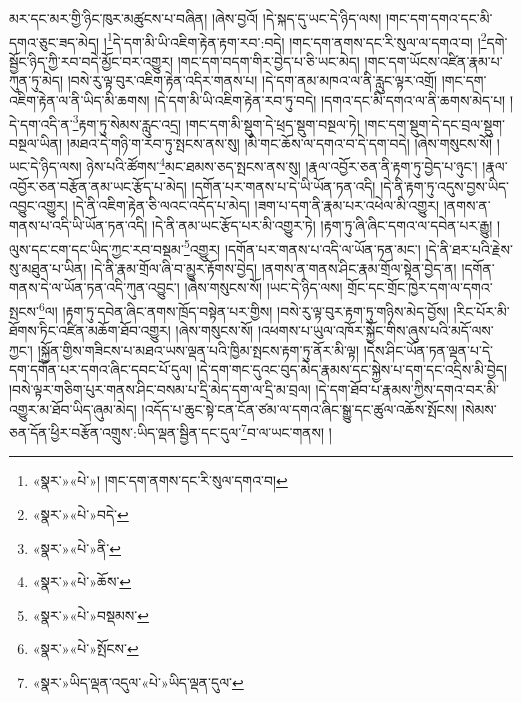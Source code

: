 མར་དང་མར་གྱི་ཉིང་ཁུར་མཚུངས་པ་བཞིན། །ཞེས་བྱའོ། །དེ་སྐད་དུ་ཡང་དེ་ཉིད་ལས། །གང་དག་དགའ་དང་མི་དགའ་ཅུང་ཟད་མེད། །\footnote{«སྣར་»«པེ་»། །གང་དག་ནགས་དང་རི་སུལ་དགའ་བ། }དེ་དག་མི་ཡི་འཇིག་རྟེན་རྟག་རབ་:བདེ། །གང་དག་ནགས་དང་རི་སུལ་ལ་དགའ་བ། །\footnote{«སྣར་»«པེ་»བདེ་}དགེ་སྦྱོང་ཉིད་ཀྱི་རབ་བདེ་མྱོང་བར་འགྱུར། །གང་དག་བདག་གིར་བྱེད་པ་ཅི་ཡང་མེད། །གང་དག་ཡོངས་འཛིན་རྣམ་པ་ཀུན་ཏུ་མེད། །བསེ་རུ་ལྟ་བུར་འཇིག་རྟེན་འདིར་གནས་པ། །དེ་དག་ནམ་མཁའ་ལ་ནི་རླུང་ལྟར་འགྲོ། །གང་དག་འཇིག་རྟེན་ལ་ནི་ཡིད་མི་ཆགས། །དེ་དག་མི་ཡི་འཇིག་རྟེན་རབ་ཏུ་བདེ། །དགའ་དང་མི་དགའ་ལ་ནི་ཆགས་མེད་པ། །དེ་དག་འདི་ན་\footnote{«སྣར་»«པེ་»ནི་}རྟག་ཏུ་སེམས་རླུང་འདྲ། །གང་དག་མི་སྡུག་དེ་ཕྲད་སྡུག་བསྔལ་ཏེ། །གང་དག་སྡུག་དེ་དང་བྲལ་སྡུག་བསྔལ་ཡིན། །མཐའ་དེ་གཉི་ག་རབ་ཏུ་སྤངས་ནས་སུ། །མི་གང་ཆོས་ལ་དགའ་བ་དེ་དག་བདེ། །ཞེས་གསུངས་སོ། །ཡང་དེ་ཉིད་ལས། ཉེས་པའི་ཚོགས་\footnote{«སྣར་»«པེ་»ཆོས་}མང་ཐམས་ཅད་སྤངས་ནས་སུ། །རྣལ་འབྱོར་ཅན་ནི་རྟག་ཏུ་བྱེད་པ་ཉུང་། །རྣལ་འབྱོར་ཅན་བརྩོན་ནམ་ཡང་རྩོད་པ་མེད། །དགོན་པར་གནས་པ་དེ་ཡི་ཡོན་ཏན་འདི། །དེ་ནི་རྟག་ཏུ་འདུས་བྱས་ཡིད་འབྱུང་འགྱུར། །དེ་ནི་འཇིག་རྟེན་ཅི་ལའང་འདོད་པ་མེད། །ཟག་པ་དག་ནི་རྣམ་པར་འཕེལ་མི་འགྱུར། །ནགས་ན་གནས་པ་འདི་ཡི་ཡོན་ཏན་འདི། །དེ་ནི་ནམ་ཡང་རྩོད་པར་མི་འགྱུར་ཏེ། །རྟག་ཏུ་ཞི་ཞིང་དགའ་ལ་དབེན་པར་རྒྱུ། །ལུས་དང་ངག་དང་ཡིད་ཀྱང་རབ་བསྡམ་\footnote{«སྣར་»«པེ་»བསྡམས་}འགྱུར། །དགོན་པར་གནས་པ་འདི་ལ་ཡོན་ཏན་མང་། །དེ་ནི་ཐར་པའི་རྗེས་སུ་མཐུན་པ་ཡིན། །དེ་ནི་རྣམ་གྲོལ་ཞི་བ་མྱུར་རྟོགས་བྱེད། །ནགས་ན་གནས་ཤིང་རྣམ་གྲོལ་སྟེན་བྱེད་ན། །དགོན་གནས་དེ་ལ་ཡོན་ཏན་འདི་ཀུན་འབྱུང་། །ཞེས་གསུངས་སོ། །ཡང་དེ་ཉིད་ལས། གྲོང་དང་གྲོང་ཁྱེར་དག་ལ་དགའ་སྤངས་\footnote{«སྣར་»«པེ་»སྤོངས་}ལ། །རྟག་ཏུ་དབེན་ཞིང་ནགས་ཁྲོད་བསྟེན་པར་གྱིས། །བསེ་རུ་ལྟ་བུར་རྟག་ཏུ་གཉིས་མེད་བྱོས། །རིང་པོར་མི་ཐོགས་ཏིང་འཛིན་མཆོག་ཐོབ་འགྱུར། །ཞེས་གསུངས་སོ། །འཕགས་པ་ཡུལ་འཁོར་སྐྱོང་གིས་ཞུས་པའི་མདོ་ལས་ཀྱང་། །སྐྱོན་གྱིས་གཟིངས་པ་མཐའ་ཡས་ལྡན་པའི་ཁྱིམ་སྤངས་རྟག་ཏུ་ནོར་མི་ལྟ། །དེས་ཤིང་ཡོན་ཏན་ལྡན་པ་དེ་དག་དགོན་པར་དགའ་ཞིང་དབང་པོ་དུལ། །དེ་དག་གང་དུའང་བུད་མེད་རྣམས་དང་སྐྱེས་པ་དག་དང་འདྲིས་མི་བྱེད། །བསེ་ལྟར་གཅིག་པུར་གནས་ཤིང་བསམ་པ་དྲི་མེད་དག་ལ་དྲི་མ་བྲལ། །དེ་དག་ཐོབ་པ་རྣམས་ཀྱིས་དགའ་བར་མི་འགྱུར་མ་ཐོབ་ཡིད་ཞུམ་མེད། །འདོད་པ་ཆུང་སྟེ་ངན་ངོན་ཙམ་ལ་དགའ་ཞིང་སྒྱུ་དང་ཚུལ་འཆོས་སྤོངས། །སེམས་ཅན་དོན་ཕྱིར་བརྩོན་འགྲུས་:ཡིད་ལྡན་སྦྱིན་དང་དུལ་\footnote{«སྣར་»ཡིད་ལྡན་འདུལ་«པེ་»ཡིད་ལྡན་དུལ་}བ་ལ་ཡང་གནས། །
